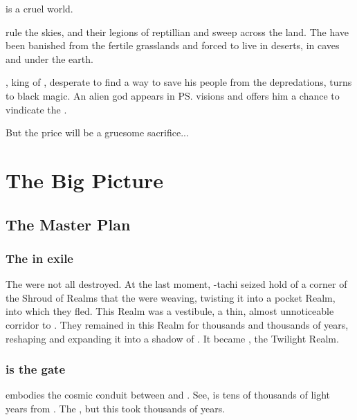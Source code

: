 \begin{blurb}
  \Miith{} is a cruel world. 
  
  \Dragons{} rule the skies, and their legions of reptillian \cregorrs{} and \scathae{} sweep across the land. 
  The \nephilim{} have been banished from the fertile grasslands and forced to live in deserts, in caves and under the earth. 
  
  \Semiza, \nephilic{} king of \Girigor, desperate to find a way to save his people from the \psp{\dragons}{} depredations, turns to black magic. 
  An alien god appears in \ps{\Semiza}{} visions and offers him a chance to vindicate the \nephilim. 
  
  But the price will be a gruesome sacrifice...
\end{blurb}
















\section{The Big Picture}
\subsection{The \Bane{} Master Plan}
\subsubsection{The \banes{} in exile}
The \banelords{} were not all destroyed. At the last moment, \Daggerrain-tachi seized hold of a corner of the Shroud of Realms that the \ophidians{} were weaving, twisting it into a pocket Realm, into which they fled. This Realm was a vestibule, a thin, almost unnoticeable corridor to \Erebos. They remained in this Realm for thousands and thousands of years, reshaping and expanding it into a shadow of \Erebos. It became \Nyx, the Twilight Realm. 





\subsubsection{\Daggerrain{} is the gate}
\Daggerrain{} embodies the cosmic conduit between \Erebos{} and \Nyx. See, \Erebos{} is tens of thousands of light years from \Miith{}. The \banes{} , but this took thousands of years. 


